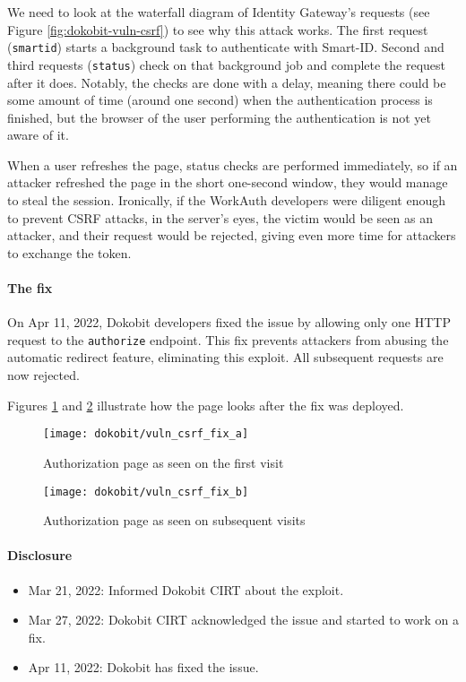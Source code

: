 We need to look at the waterfall diagram of Identity Gateway's requests (see Figure \ref{fig:dokobit-vuln-csrf}) to see why this attack works. The first request (\texttt{smartid}) starts a background task to authenticate with Smart-ID. Second and third requests (\texttt{status}) check on that background job and complete the request after it does. Notably, the checks are done with a delay, meaning there could be some amount of time (around one second) when the authentication process is finished, but the browser of the user performing the authentication is not yet aware of it.

When a user refreshes the page, status checks are performed immediately, so if an attacker refreshed the page in the short one-second window, they would manage to steal the session. Ironically, if the WorkAuth developers were diligent enough to prevent CSRF attacks, in the server's eyes, the victim would be seen as an attacker, and their request would be rejected, giving even more time for attackers to exchange the token.

\paragraph{The fix}

On Apr 11, 2022, Dokobit developers fixed the issue by allowing only one HTTP request to the \texttt{authorize} endpoint. This fix prevents attackers from abusing the automatic redirect feature, eliminating this exploit. All subsequent requests are now rejected.

Figures \ref{fig:dokobit-vuln-csrf-fix-a} and \ref{fig:dokobit-vuln-csrf-fix-b} illustrate how the page looks after the fix was deployed.

\begin{figure}
  \centering
  \texttt{[image: dokobit/vuln\_csrf\_fix\_a]}
  \caption{Authorization page as seen on the first visit}
  \label{fig:dokobit-vuln-csrf-fix-a}
\end{figure}

\begin{figure}
  \centering
  \texttt{[image: dokobit/vuln\_csrf\_fix\_b]}
  \caption{Authorization page as seen on subsequent visits}
  \label{fig:dokobit-vuln-csrf-fix-b}
\end{figure}

\paragraph{Disclosure}

\begin{itemize}
  \item Mar 21, 2022: Informed Dokobit CIRT about the exploit.
  \item Mar 27, 2022: Dokobit CIRT acknowledged the issue and started to work on a fix.
  \item Apr 11, 2022: Dokobit has fixed the issue.
\end{itemize}